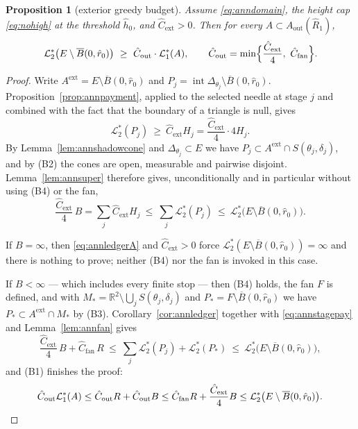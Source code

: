 \documentclass[11pt]{article}
\theoremstyle{plain}
\newtheorem{proposition}[theorem]{Proposition}
\theoremstyle{definition}
\theoremstyle{remark}
\newcommand{\R}{\mathbb{R}}
\newcommand{\Lout}{\mathcal{L}^{*}_{2}}
\newcommand{\Lone}{\mathcal{L}^{*}_{1}}
\newcommand{\Aout}{A_{\mathrm{out}}}
\begin{document}
\begin{proposition}[exterior greedy budget]\label{prop:annbudget}
Assume \eqref{eq:anndomain}, the height cap \eqref{eq:nohigh} at the threshold
$\hat h_{0}$, and $\hat C_{\mathrm{ext}}>0$. Then for every
$A\subset\Aout(\hat R_{1})$,
\[
  \Lout\bigl(E\setminus\overline B(0,\hat r_{0})\bigr)
  \ \ge\ \hat C_{\mathrm{out}}\cdot\Lone(A),
  \qquad
  \hat C_{\mathrm{out}}
  =\min\Bigl\{\frac{\hat C_{\mathrm{ext}}}{4},\ \hat C_{\mathrm{fan}}\Bigr\}.
\]
\end{proposition}

\begin{proof}
Write $A^{\mathrm{ext}}=E\setminus\overline B(0,\hat r_{0})$ and
$P_{j}=\operatorname{int}\Delta_{\theta_{j}}\setminus\overline B(0,\hat r_{0})$.
Proposition~\ref{prop:annpayment}, applied to the selected needle at stage $j$
and combined with the fact that the boundary of a triangle is null, gives
\begin{equation}\label{eq:annstagepay}
  \Lout(P_{j})\ \ge\ \hat C_{\mathrm{ext}}H_{j}
  =\frac{\hat C_{\mathrm{ext}}}{4}\cdot4H_{j}.
\end{equation}
By Lemma~\ref{lem:annshadowcone} and $\Delta_{\theta_{j}}\subset E$ we have
$P_{j}\subset A^{\mathrm{ext}}\cap S(\theta_{j},\delta_{j})$, and by (B2) the
cones are open, measurable and pairwise disjoint. Lemma~\ref{lem:annsuper}
therefore gives, unconditionally and in particular without using (B4) or the
fan,
\begin{equation}\label{eq:annledgerA}
  \frac{\hat C_{\mathrm{ext}}}{4}\,B=\sum_{j}\hat C_{\mathrm{ext}}H_{j}
  \ \le\ \sum_{j}\Lout(P_{j})
  \ \le\ \Lout\bigl(E\setminus\overline B(0,\hat r_{0})\bigr).
\end{equation}

If $B=\infty$, then \eqref{eq:annledgerA} and $\hat C_{\mathrm{ext}}>0$ force
$\Lout(E\setminus\overline B(0,\hat r_{0}))=\infty$ and there is nothing to
prove; neither (B4) nor the fan is invoked in this case.

If $B<\infty$ --- which includes every finite stop --- then (B4) holds, the fan
$F$ is defined, and with
$M_{*}=\R^{2}\setminus\bigcup_{j}S(\theta_{j},\delta_{j})$ and
$P_{*}=F\setminus\overline B(0,\hat r_{0})$ we have
$P_{*}\subset A^{\mathrm{ext}}\cap M_{*}$ by (B3).
Corollary~\ref{cor:annledger} together with \eqref{eq:annstagepay} and
Lemma~\ref{lem:annfan} gives
\begin{equation}\label{eq:annledgerB}
  \frac{\hat C_{\mathrm{ext}}}{4}\,B+\hat C_{\mathrm{fan}}\,R
  \ \le\ \sum_{j}\Lout(P_{j})+\Lout(P_{*})
  \ \le\ \Lout\bigl(E\setminus\overline B(0,\hat r_{0})\bigr),
\end{equation}
and (B1) finishes the proof:
\[
  \hat C_{\mathrm{out}}\Lone(A)
  \le\hat C_{\mathrm{out}}R+\hat C_{\mathrm{out}}B
  \le\hat C_{\mathrm{fan}}R+\frac{\hat C_{\mathrm{ext}}}{4}B
  \le\Lout\bigl(E\setminus\overline B(0,\hat r_{0})\bigr). \qedhere
\]
\end{proof}
\end{document}
